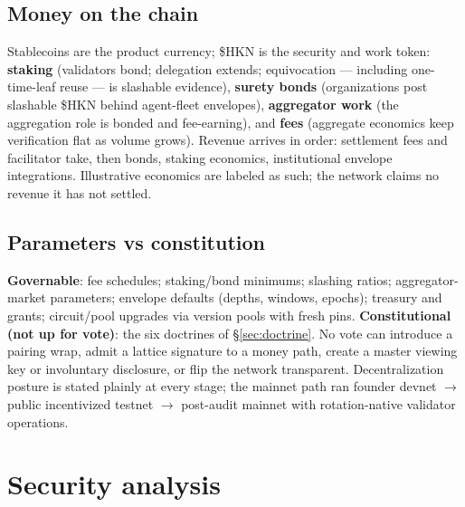 \documentclass[11pt]{article}
\newcommand{\HKN}{\$HKN}
\begin{document}
\subsection{Money on the chain}
Stablecoins are the product currency; \HKN{} is the security and work token: \textbf{staking} (validators bond; delegation extends; equivocation --- including one-time-leaf reuse --- is slashable evidence), \textbf{surety bonds} (organizations post slashable \HKN{} behind agent-fleet envelopes), \textbf{aggregator work} (the aggregation role is bonded and fee-earning), and \textbf{fees} (aggregate economics keep verification flat as volume grows). Revenue arrives in order: settlement fees and facilitator take, then bonds, staking economics, institutional envelope integrations. Illustrative economics are labeled as such; the network claims no revenue it has not settled.

\subsection{Parameters vs constitution}
\textbf{Governable}: fee schedules; staking/bond minimums; slashing ratios; aggregator-market parameters; envelope defaults (depths, windows, epochs); treasury and grants; circuit/pool upgrades via version pools with fresh pins. \textbf{Constitutional (not up for vote)}: the six doctrines of \S\ref{sec:doctrine}. No vote can introduce a pairing wrap, admit a lattice signature to a money path, create a master viewing key or involuntary disclosure, or flip the network transparent. Decentralization posture is stated plainly at every stage; the mainnet path ran founder devnet $\rightarrow$ public incentivized testnet $\rightarrow$ post-audit mainnet with rotation-native validator operations.

\section{Security analysis}
\end{document}
